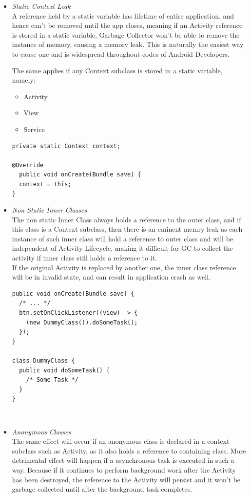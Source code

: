 \documentclass[journal]{IEEEtran}
\begin{document}
\begin{itemize}
	\item \emph{Static Context Leak}\\
	A reference held by a static variable has lifetime of entire application, and hence can't be removed until the app closes, meaning if an Activity reference is stored in a static variable, Garbage Collector won't be able to remove the instance of memory, causing a memory leak. This is naturally the easiest way \cite{ways} to cause one and is widespread throughout codes of Android Developers.
	
	
	The same applies if any Context subclass is stored in a static variable, namely:
	\begin{itemize}
		\item Activity
		\item View
		\item Service
	\end{itemize}
\begin{verbatim}
private static Context context;
	
@Override
  public void onCreate(Bundle save) {
  context = this;
}
\end{verbatim}

	\item \emph{Non Static Inner Classes}\\
	The non static Inner Class always holds a reference to the outer class, and if this class is a Context subclass, then there is an eminent memry leak as each instance of such inner class will hold a reference to outer class and will be independent of Activity Lifecycle, making it difficult for GC to collect the activity if inner class still holds a reference to it.\\
	
	If the original Activity is replaced by another one, the inner class reference will be in invalid state, and can result in application crash as well.
\begin{verbatim}
public void onCreate(Bundle save) {
  /* ... */
  btn.setOnClickListener((view) -> {
    (new DummyClass()).doSomeTask();
  });
}

class DummyClass {
  public void doSomeTask() {
    /* Some Task */
  }
}
\end{verbatim}
\\

	\item \emph{Anonymous Classes}\\
	The same effect will occur if an anonymous class is declared in a context subclass such as Activity, as it also holds a reference to containing class. More detrimental effect will happen if a asynchronous task is executed in such a way. Because if it continues to perform background work after the Activity has been destroyed, the reference to the Activity will persist and it won’t be garbage collected until after the background task completes.\\
	

\end{itemize}
\end{document}
